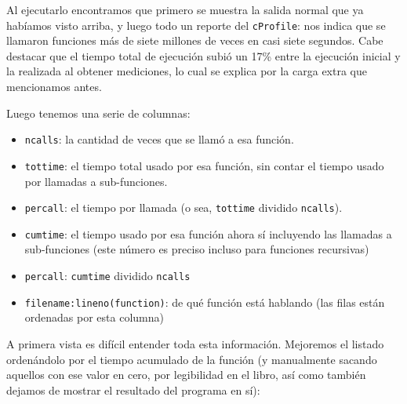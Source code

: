 Al ejecutarlo encontramos que primero se muestra la salida normal que ya habíamos visto arriba, y luego todo un reporte del \texttt{cProfile}: nos indica que se llamaron funciones más de siete millones de veces en casi siete segundos. Cabe destacar que el tiempo total de ejecución subió un 17\% entre la ejecución inicial y la realizada al obtener mediciones, lo cual se explica por la carga extra que mencionamos antes. 

Luego tenemos una serie de columnas:

\begin{itemize}
    \item \texttt{ncalls}: la cantidad de veces que se llamó a esa función.
    \item \texttt{tottime}: el tiempo total usado por esa función, sin contar el tiempo usado por llamadas a sub-funciones.
    \item \texttt{percall}: el tiempo por llamada (o sea, \texttt{tottime} dividido \texttt{ncalls}).
    \item \texttt{cumtime}:  el tiempo usado por esa función ahora sí incluyendo las llamadas a sub-funciones (este número es preciso incluso para funciones recursivas)
    \item \texttt{percall}: \texttt{cumtime} dividido \texttt{ncalls}
    \item \texttt{filename:lineno(function)}: de qué función está hablando (las filas están ordenadas por esta columna)
\end{itemize}

A primera vista es difícil entender toda esta información. Mejoremos el listado ordenándolo por el tiempo acumulado de la función (y manualmente sacando aquellos con ese valor en cero, por legibilidad en el libro, así como también dejamos de mostrar el resultado del programa en sí):

